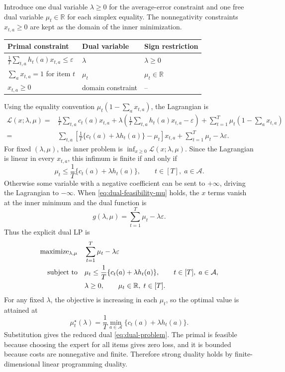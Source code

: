 \documentclass[11pt]{article}
\newcommand{\R}{\mathbb{R}}
\newcommand{\calA}{\mathcal{A}}
\newcommand{\calL}{\mathcal{L}}
\newcommand{\eps}{\varepsilon}
\begin{document}
Introduce one dual variable $\lambda\ge0$ for the average-error constraint and
one free dual variable $\mu_t\in\R$ for each simplex equality.
The nonnegativity constraints $x_{t,a}\ge0$ are kept as the domain of the inner
minimization.
\begin{center}
\begin{tabular}{lll}
\toprule
Primal constraint & Dual variable & Sign restriction \\
\midrule
$\frac1T\sum_{t,a} h_t(a)x_{t,a}\le\eps$
    & $\lambda$ & $\lambda\ge0$ \\
$\sum_a x_{t,a}=1$ for item $t$
    & $\mu_t$ & $\mu_t\in\R$ \\
$x_{t,a}\ge0$
    & domain constraint & -- \\
\bottomrule
\end{tabular}
\end{center}
Using the equality convention $\mu_t(1-\sum_a x_{t,a})$, the Lagrangian is
\begin{align}
    \calL(x;\lambda,\mu)
    =
    &\frac1T\sum_{t,a} c_t(a)x_{t,a}
    +\lambda\left(
        \frac1T\sum_{t,a}h_t(a)x_{t,a}-\eps
    \right)
    +\sum_{t=1}^T\mu_t\left(1-\sum_a x_{t,a}\right) \nonumber\\
    =
    &\sum_{t,a}
    \left[
        \frac1T\{c_t(a)+\lambda h_t(a)\}-\mu_t
    \right]x_{t,a}
    +\sum_{t=1}^T\mu_t-\lambda\eps .
    \label{eq:full-lagrangian}
\end{align}
For fixed $(\lambda,\mu)$, the inner problem is
$\inf_{x\ge0}\calL(x;\lambda,\mu)$.
Since the Lagrangian is linear in every $x_{t,a}$, this infimum is finite if
and only if
\begin{equation}
    \mu_t
    \le
    \frac1T\{c_t(a)+\lambda h_t(a)\},
    \qquad t\in[T],\; a\in\calA .
    \label{eq:dual-feasibility-mu}
\end{equation}
Otherwise some variable with a negative coefficient can be sent to $+\infty$,
driving the Lagrangian to $-\infty$.
When \eqref{eq:dual-feasibility-mu} holds, the $x$ terms vanish at the inner
minimum and the dual function is
\[
    g(\lambda,\mu)=\sum_{t=1}^T\mu_t-\lambda\eps .
\]
Thus the explicit dual LP is
\begin{align}
    \textnormal{maximize}_{\lambda,\mu}\quad
    & \sum_{t=1}^T\mu_t-\lambda\eps
    \label{eq:explicit-mu-dual}\\
    \textnormal{subject to}\quad
    & \mu_t
    \le
    \frac1T\{c_t(a)+\lambda h_t(a)\},
    \qquad t\in[T],\; a\in\calA, \nonumber\\
    & \lambda\ge0,\qquad \mu_t\in\R,\; t\in[T]. \nonumber
\end{align}
For any fixed $\lambda$, the objective is increasing in each $\mu_t$, so the
optimal value is attained at
\[
    \mu_t^\star(\lambda)
    =
    \frac1T\min_{a\in\calA}\{c_t(a)+\lambda h_t(a)\}.
\]
Substitution gives the reduced dual \eqref{eq:dual-problem}.
The primal is feasible because choosing the expert for all items gives zero
loss, and it is bounded because costs are nonnegative and finite.
Therefore strong duality holds by finite-dimensional linear programming
duality.
\end{document}
